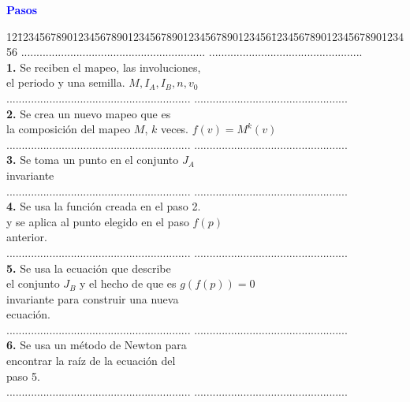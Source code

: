 \begin{center}
	\textcolor{blue}{\textbf{Pasos}}
	\begin{tabbing}
	12\=1234567890123456789012345678901234567890123456\=12345678901234567890123456\kill%
	\>............................................................  \>..................................................\\
	\>\textbf{1.}  Se reciben el mapeo, las involuciones,  \> \\
	\>el periodo y una semilla. \>$M, I_{A}, I_{B},n,v_{0}$ \\
	\>............................................................  \>..................................................\\
	\>\textbf{2.} Se crea un nuevo mapeo que es \> \\
	\> la composición del mapeo $M$, $k$ veces.\>  $f(v)=M^{k}(v)$ \\
	\>............................................................  \>..................................................\\
	\>\textbf{3.} Se toma un punto en el conjunto  \> $J_{A}$\\
	\> invariante \> \\
	\>............................................................  \>..................................................\\
	\>\textbf{4.} Se usa la función creada en el paso 2. \> \\
	\> y se aplica al punto elegido en el paso \> $f(p)$\\
	\> anterior.\> \\
	\>............................................................  \>..................................................\\
	\>\textbf{5.} Se usa la ecuación que describe \> \\
	\> el conjunto $J_{B}$ y el hecho de que es  \> $g(f(p))=0$\\
	\>invariante para construir una nueva  \> \\
	\> ecuación.\\
	\>............................................................  \>..................................................\\
	\>\textbf{6.}  Se usa un método de Newton para \> \\
	\> encontrar la raíz de la ecuación del \> \\
	\> paso 5.\\
	\>............................................................  \>..................................................\\
	\end{tabbing} 
\end{center}

